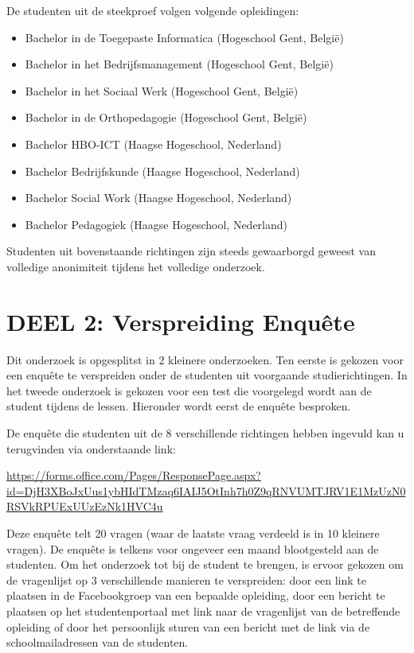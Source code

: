 De studenten uit de steekproef volgen volgende opleidingen:
\begin{itemize}
\item Bachelor in de Toegepaste Informatica (Hogeschool Gent, België)
\item Bachelor in het Bedrijfsmanagement (Hogeschool Gent, België)
\item Bachelor in het Sociaal Werk (Hogeschool Gent, België)
\item Bachelor in de Orthopedagogie (Hogeschool Gent, België)

\item Bachelor HBO-ICT (Haagse Hogeschool, Nederland)
\item Bachelor Bedrijfskunde (Haagse Hogeschool, Nederland)
\item Bachelor Social Work (Haagse Hogeschool, Nederland)
\item Bachelor Pedagogiek (Haagse Hogeschool, Nederland)
\end{itemize}

Studenten uit bovenstaande richtingen zijn steeds gewaarborgd geweest van volledige anonimiteit tijdens het volledige onderzoek. 

\section{DEEL 2: Verspreiding Enquête}
\label{sec:enquete}

Dit onderzoek is opgesplitst in 2 kleinere onderzoeken. Ten eerste is gekozen voor een enquête te verspreiden onder de studenten uit voorgaande studierichtingen. In het tweede onderzoek is gekozen voor een test die voorgelegd wordt aan de student tijdens de lessen. Hieronder wordt eerst de enquête besproken.

De enquête die studenten uit de 8 verschillende richtingen hebben ingevuld kan u terugvinden via onderstaande link:

\url{https://forms.office.com/Pages/ResponsePage.aspx?id=DjH3XBoJxUus1ybHIdTMzaq6IAIJ5OtInh7h0Z9qRNVUMTJRV1E1MzUzN0RSVkRPUExUUzEzNk1HVC4u}

Deze enquête telt 20 vragen (waar de laatste vraag verdeeld is in 10 kleinere vragen). De enquête is telkens voor ongeveer een maand blootgesteld aan de studenten. Om het onderzoek tot bij de student te brengen, is ervoor gekozen om de vragenlijst op 3 verschillende manieren te verspreiden: door een link te plaatsen in de Facebookgroep van een bepaalde opleiding, door een bericht te plaatsen op het studentenportaal met link naar de vragenlijst van de betreffende opleiding of door het persoonlijk sturen van een bericht met de link via de schoolmailadressen van de studenten.

